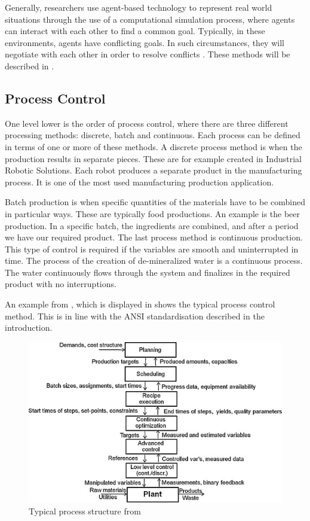 Generally, researchers use agent-based technology to represent real world situations through the use of a computational simulation process, where agents can interact with each other to find a common goal. Typically, in these environments, agents have conflicting goals. In such circumstances, they will negotiate with each other in order to resolve conflicts \citep{rosa2009intelligent}. These methods will be described in .
		
	
\subsection{Process Control}
One level lower is the order of process control, where there are three different processing methods: discrete, batch and continuous. Each process can be defined in terms of one or more of these methods. A discrete process method is when the production results in separate pieces. These are for example created in Industrial Robotic Solutions. Each robot produces a separate product in the manufacturing process. It is one of the most used manufacturing production application.

Batch production is when specific quantities of the materials have to be combined in particular ways. These are typically food productions. An example is the beer production. In a specific batch, the ingredients are combined, and after a period we have our required product. The last process method is continuous production. This type of control is required if the variables are smooth and uninterrupted in time. The process of the creation of de-mineralized water is a continuous process. The water continuously flows through the system and finalizes in the required product with no interruptions. 

An example from \citet{engell2012optimal}, which is displayed in  shows the typical process control method. This is in line with the ANSI standardisation described in the introduction. 

\begin{figure}[h]
\centering
\includegraphics[width=0.7\linewidth]{img/process_structure}
\caption{Typical process structure from \citep{engell2012optimal}}
\label{fig:processstructure}
\end{figure}

